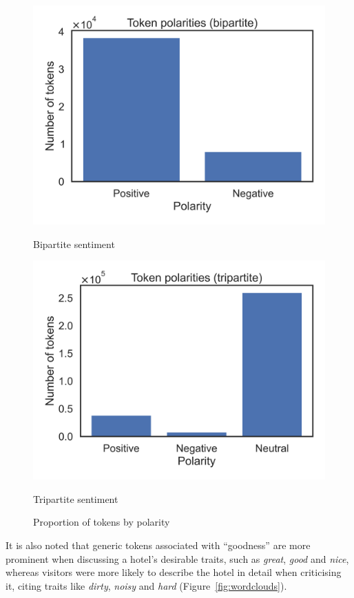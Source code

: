 \documentclass[11pt, a4paper]{pancake-article}
\begin{document}
\begin{figure}[htpb]
	\centering
	\begin{minipage}{0.5\textwidth}
		\centering
		\includegraphics[width=\textwidth]{../results/old/bar_bipartite.png}
		\caption*{Bipartite sentiment}
	\end{minipage}\hfill
	\begin{minipage}{0.5\textwidth}
		\centering
		\includegraphics[width=\textwidth]{../results/old/bar_tripartite.png}
		\caption*{Tripartite sentiment}
	\end{minipage}
	\caption{Proportion of tokens by polarity}
	\label{fig:bars}
\end{figure}

It is also noted that generic tokens associated with ``goodness'' are more
prominent when discussing a hotel's desirable traits, such as \textit{great},
\textit{good} and \textit{nice}, whereas visitors were more likely to
describe the hotel in detail when criticising it, citing traits like
\textit{dirty}, \textit{noisy} and \textit{hard} (Figure~\ref{fig:wordclouds}).
\end{document}
